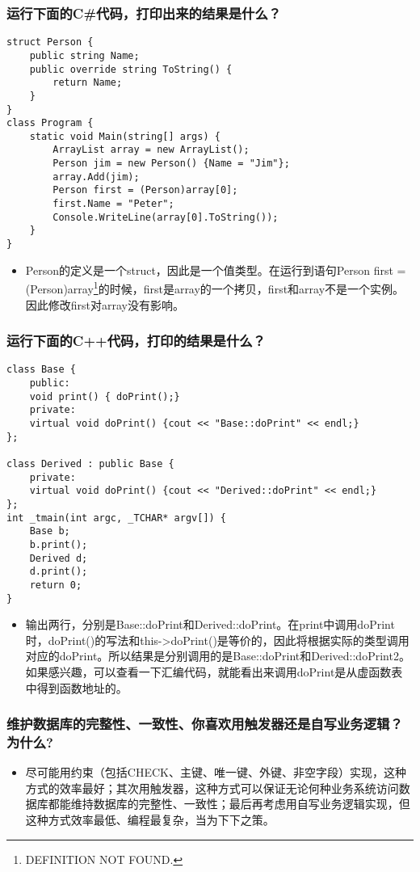 \documentclass[9pt, b5paper]{article}
\begin{document}
\subsubsection{运行下面的C\#代码，打印出来的结果是什么？}
\label{sec-1-2-92}
\begin{verbatim}
struct Person {
    public string Name;
    public override string ToString() {
        return Name;
    }
}
class Program {
    static void Main(string[] args) {
        ArrayList array = new ArrayList();
        Person jim = new Person() {Name = "Jim"};
        array.Add(jim);
        Person first = (Person)array[0];
        first.Name = "Peter";
        Console.WriteLine(array[0].ToString());
    }
}
\end{verbatim}
\begin{itemize}
\item Person的定义是一个struct，因此是一个值类型。在运行到语句Person first = (Person)array\footnote{DEFINITION NOT FOUND.}的时候，first是array\footnotemark[1]{}的一个拷贝，first和array\footnotemark[1]{}不是一个实例。因此修改first对array\footnotemark[1]{}没有影响。
\end{itemize}
\subsubsection{运行下面的C++代码，打印的结果是什么？}
\label{sec-1-2-93}
\begin{verbatim}
class Base {
    public:
    void print() { doPrint();}
    private:
    virtual void doPrint() {cout << "Base::doPrint" << endl;}
};
 
class Derived : public Base {
    private:
    virtual void doPrint() {cout << "Derived::doPrint" << endl;}
};
int _tmain(int argc, _TCHAR* argv[]) {
    Base b;
    b.print();
    Derived d;
    d.print();
    return 0;
}
\end{verbatim}
\begin{itemize}
\item 输出两行，分别是Base::doPrint和Derived::doPrint。在print中调用doPrint时，doPrint()的写法和this->doPrint()是等价的，因此将根据实际的类型调用对应的doPrint。所以结果是分别调用的是Base::doPrint和Derived::doPrint2。如果感兴趣，可以查看一下汇编代码，就能看出来调用doPrint是从虚函数表中得到函数地址的。
\end{itemize}
\subsubsection{维护数据库的完整性、一致性、你喜欢用触发器还是自写业务逻辑？为什么?}
\label{sec-1-2-94}
\begin{itemize}
\item 尽可能用约束（包括CHECK、主键、唯一键、外键、非空字段）实现，这种方式的效率最好；其次用触发器，这种方式可以保证无论何种业务系统访问数据库都能维持数据库的完整性、一致性；最后再考虑用自写业务逻辑实现，但这种方式效率最低、编程最复杂，当为下下之策。
\end{itemize}
\end{document}
